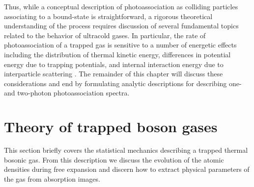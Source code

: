Thus, while a conceptual description of photoassociation as colliding particles associating to a bound-state is straightforward, a rigorous theoretical understanding of the process requires discussion of several fundamental topics related to the behavior of ultracold gases.
In particular, the rate of photoassociation of a trapped gas is sensitive to a number of energetic effects including the distribution of thermal kinetic energy, differences in potential energy due to trapping potentials, and internal interaction energy due to interparticle scattering \cite{Julienne2009a}.
The remainder of this chapter will discuss these considerations and end by formulating analytic descriptions for describing one- and two-photon photoassociation spectra.

\section{Theory of trapped boson gases} \label{sec:trapped_gases}
This section briefly covers the statistical mechanics describing a trapped thermal bosonic gas.
From this description we discuss the evolution of the atomic densities during free expansion and discern how to extract physical parameters of the gas from absorption images.

